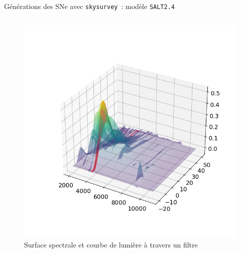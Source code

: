 \documentclass{beamer}
\def\skysurvey{\texttt{skysurvey}\xspace}
\def\saltd{\texttt{SALT2.4}\xspace}
\begin{document}
\begin{frame}{Générations des SNe avec \skysurvey~: modèle \saltd}
\begin{columns}
\begin{column}{.5\textwidth}
\begin{figure}
			\includegraphics[width=.9\textwidth, trim={1cm 1cm 1cm 2cm}, clip]{figures/model_w_lc.png}
			\caption{Surface spectrale et courbe de lumière à travers un filtre}
		\end{figure}
	\end{column}
\end{columns}
\end{frame}
\end{document}
